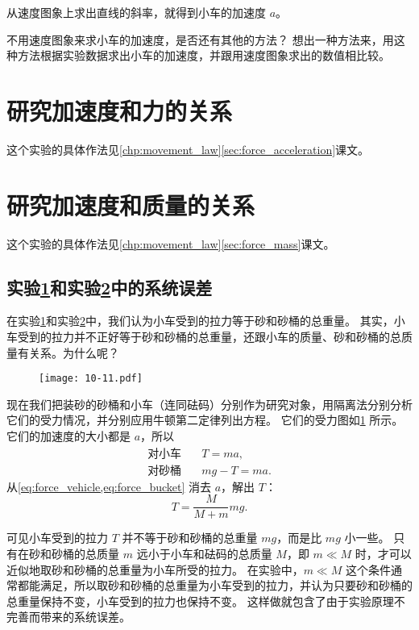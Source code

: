 从速度图象上求出直线的斜率，就得到小车的加速度 $a$。

不用速度图象来求小车的加速度，是否还有其他的方法？
想出一种方法来，用这种方法根据实验数据求出小车的加速度，并跟用速度图象求出的数值相比较。

\section{研究加速度和力的关系}\label{sec:experiment_f_a}
这个实验的具体作法见\cref{chp:movement_law}\cref{sec:force_acceleration}课文。

\section{研究加速度和质量的关系}\label{sec:experiment_f_m}
这个实验的具体作法见\cref{chp:movement_law}\cref{sec:force_mass}课文。

\subsection*{实验\ref{sec:experiment_f_a}和实验\ref{sec:experiment_f_m}中的系统误差}
在实验\ref{sec:experiment_f_a}和实验\ref{sec:experiment_f_m}中，我们认为小车受到的拉力等于砂和砂桶的总重量。
其实，小车受到的拉力并不正好等于砂和砂桶的总重量，还跟小车的质量、砂和砂桶的总质量有关系。为什么呢？

\begin{figure}
  \texttt{[image: 10-11.pdf]}
  \caption{}\label{fig:10-11}
\end{figure}	

现在我们把装砂的砂桶和小车（连同砝码）分别作为研究对象，用隔离法分别分析它们的受力情况，并分别应用牛顿第二定律列出方程。
它们的受力图如\cref{fig:10-11} 所示。它们的加速度的大小都是 $a$，所以
\begin{align}
  \label{eq:force_vehicle}  \text{对小车}&\quad T=ma,   \\
  \label{eq:force_bucket}  \text{对砂桶}&\quad mg-T=ma. 
\end{align}
从\cref{eq:force_vehicle,eq:force_bucket} 消去 $a$，解出 $T$：
\begin{equation}
  T=\frac{M}{M+m}mg.
\end{equation}

可见小车受到的拉力 $T$ 并不等于砂和砂桶的总重量 $mg$，而是比 $mg$ 小一些。
只有在砂和砂桶的总质量 $m$ 远小于小车和砝码的总质量 $M$，即 $m \ll M$ 时，才可以近似地取砂和砂桶的总重量为小车所受的拉力。
在实验中，$m\ll M$ 这个条件通常都能满足，所以取砂和砂桶的总重量为小车受到的拉力，并认为只要砂和砂桶的总重量保持不变，小车受到的拉力也保持不变。
这样做就包含了由于实验原理不完善而带来的系统误差。

